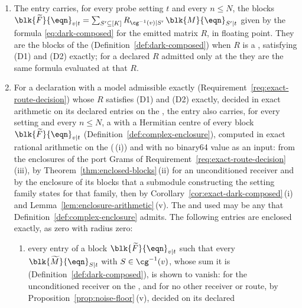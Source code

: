 \begin{requirement}\label{req:dark-composed-reference}
\begin{enumerate}[label=(\roman*),leftmargin=2.4em]
\item The  entry carries, for every probe setting $t$
  and every $n\le N$, the blocks
  $\blk{\widetilde F}{\eqn}_{v|t}=\sum_{S'\subseteq[K]}R_{\cg^{-1}(v)|S'}\,\blk{M}{\eqn}_{S'|t}$
  given by the formula \eqref{eq:dark-composed} for the emitted matrix $R$, in
  floating point. They are the blocks of the 
  (Definition~\ref{def:dark-composed}) when $R$ is a ,
  satisfying (D1) and (D2) exactly; for a declared $R$ admitted only at the
   they are the same formula evaluated at that $R$.
\item For a declaration with a model admissible exactly
  (Requirement~\ref{req:exact-route-decision}) whose $R$ satisfies (D1) and
  (D2) exactly, decided in exact arithmetic on its declared entries on the
  , the entry also carries, for every setting
  and every $n\le N$, a  with a Hermitian centre of
  every block $\blk{\widetilde F}{\eqn}_{v|t}$
  (Definition~\ref{def:complex-enclosure}), computed in exact rational
  arithmetic on the 
  (\,(i)) and with no binary64 value as an
  input: from the enclosures of the port Grams of
  Requirement~\ref{req:exact-route-decision}\,(iii), by
  Theorem~\ref{thm:enclosed-blocks}\,(ii) for an unconditioned receiver and
  by the enclosure of its blocks that a submodule constructing the setting
  family states for that family, then by Corollary~\ref{cor:exact-dark-composed}\,(i) and
  Lemma~\ref{lem:enclosure-arithmetic}\,(v). The
   and
   used may be any that
  Definition~\ref{def:complex-enclosure} admits. The following entries are
  enclosed exactly, as zero with radius zero:
  \begin{enumerate}[label=(\alph*),leftmargin=2.0em]
  \item every entry of a block $\blk{\widetilde F}{\eqn}_{v|t}$ such that
    every $\blk{\widetilde M}{\eqn}_{S|t}$ with $S\in\cg^{-1}(v)$, whose sum
    it is (Definition~\ref{def:dark-composed}), is shown to vanish: for the
    unconditioned receiver on the , and
    for no other receiver or route, by
    Proposition~\ref{prop:noise-floor}\,(v), decided on its declared

\end{enumerate}
\end{enumerate}
\end{requirement}
